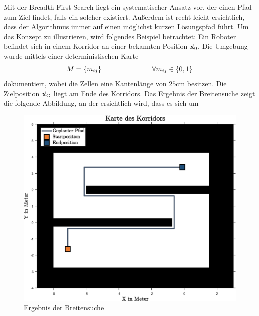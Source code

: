 Mit der Breadth-First-Search liegt ein systematischer Ansatz vor, der einen Pfad zum Ziel findet, falls ein solcher existiert. Außerdem ist recht leicht ersichtlich, dass der Algorithmus immer auf einen möglichst kurzen Lösungspfad führt. Um das Konzept zu illustrieren, wird folgendes Beispiel betrachtet: Ein Roboter befindet sich in einem Korridor an einer bekannten Position $\vec{\mathbf{x}}_{\text{0}}$. Die Umgebung wurde mittels einer deterministischen Karte
\begin{equation}
M = \left\{m_{ij}\right\} \hspace{2.5cm} \forall m_{ij} \in \left\{0, 1\right\}
\end{equation}
dokumentiert, wobei die Zellen eine Kantenlänge von $25 \text{cm}$ besitzen. Die Zielposition $\vec{\mathbf{x}}_{\text{G}}$ liegt am Ende des Korridors. Das Ergebnis der Breitensuche zeigt die folgende Abbildung, an der ersichtlich wird, dass es sich um 
\begin{figure}[!ht]
\centering
\includegraphics[width=0.7\linewidth]{img/KorridorBeispiel_img1.eps}
\caption{Ergebnis der Breitensuche}
\end{figure}


